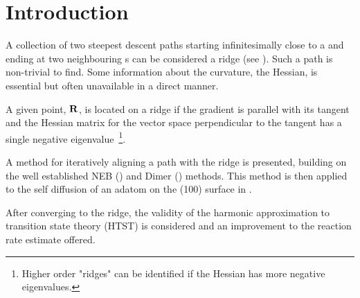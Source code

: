 \section{Introduction}
\label{sec:erm-introduction}
A collection of two steepest descent paths starting infinitesimally close to a  and ending at two neighbouring s can be considered a ridge (see ).
Such a path is non-trivial to find.
Some information about the curvature, the Hessian, is essential but often unavailable in a direct manner.

A given point, ${\mathrm{\mathbf{\bm{R}}}}$, is located on a ridge if the gradient is parallel with its tangent and the Hessian matrix for the vector space perpendicular to the tangent has a single negative eigenvalue~\footnote{Higher order "ridges" can be identified if the Hessian has more negative eigenvalues.}.

A method for iteratively aligning a path with the ridge is presented, building on the well established NEB () and Dimer () methods.
This method is then applied to the self diffusion of an adatom on the (100) surface in .

After converging to the ridge, the validity of the harmonic approximation to transition state theory (HTST) is considered and an improvement to the reaction rate estimate offered.
